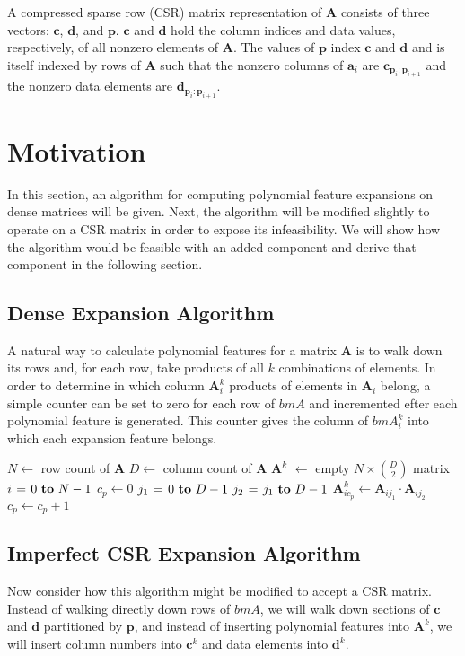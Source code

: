 \documentclass{article} %
\begin{document}
A compressed sparse row (CSR) matrix representation of $\bm{A}$ consists of three vectors: $\bm{c}$, $\bm{d}$, and $\bm{p}$.
$\bm{c}$ and $\bm{d}$ hold the column indices and data values, respectively, of all nonzero elements of $\bm{A}$.
The values of $\bm{p}$ index $\bm{c}$ and $\bm{d}$ and is itself indexed by rows of $\bm{A}$ such that the nonzero columns of $\bm{a}_i$ are $\bm{c}_{\bm{p}_i:\bm{p}_{i+1}}$ and the nonzero data elements are $\bm{d}_{\bm{p}_i:\bm{p}_{i+1}}$.

\section{Motivation}
In this section, an algorithm for computing polynomial feature expansions on dense matrices will be given.
Next, the algorithm will be modified slightly to operate on a CSR matrix in order to expose its infeasibility.
We will show how the algorithm would be feasible with an added component and derive that component in the following section.

\subsection{Dense Expansion Algorithm}
A natural way to calculate polynomial features for a matrix $\bm{A}$ is to walk down its rows and, for each row, take products of all $k$ combinations of elements.
In order to determine in which column $\bm{A}^k_i$ products of elements in $\bm{A}_i$ belong, a simple counter can be set to zero for each row of $bm{A}$ and incremented efter each polynomial feature is generated.
This counter gives the column of $bm{A}^k_i$ into which each expansion feature belongs.

\begin{codebox}
\footnotesize
{}
    \li $N \gets$ row count of $\bm{A}$
    \li $D \gets$ column count of $\bm{A}$
    \li $\bm{A}^k$ $\gets$ empty $N \times \binom{D}{2}$ matrix
    \li \For $i \gets 0 \To N-1$ \Do
    \li     $c_p \gets 0$
    \li     \For $j_1 \gets 0 \To D-1$ \Do
    \li         \For $j_2 \gets j_1 \To D-1$ \Do
    \li             $\bm{A}^k_{i{c_p}} \gets \bm{A}_{ij_1} \cdot \bm{A}_{ij_2}$
    \li             $c_p \gets c_p + 1$
                \End
            \End
       	\End
\end{codebox}

\subsection{Imperfect CSR Expansion Algorithm}
\label{sec:final-algo}
Now consider how this algorithm might be modified to accept a CSR matrix.
Instead of walking directly down rows of $bm{A}$, we will walk down sections of $\bm{c}$ and $\bm{d}$ partitioned by $\bm{p}$, and instead of inserting polynomial features into $\bm{A}^k$, we will insert column numbers into $\bm{c}^k$ and data elements into $\bm{d}^k$.
\end{document}
